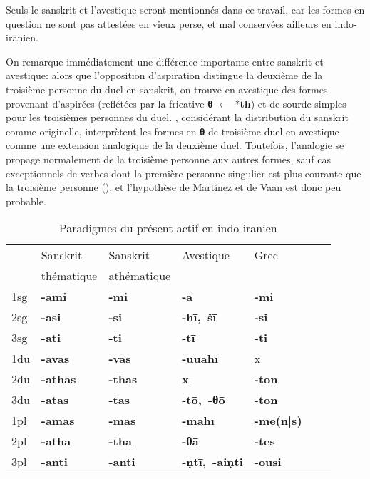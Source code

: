 \documentclass[oneside,a4paper,11pt]{article}
\newcommand{\ipa}[1]{{\phon\mbox{\textbf{#1}}}}
\newcommand{\grise}[1]{\cellcolor{lightgray}\textbf{#1}}
\begin{document}
Seuls le sanskrit et l'avestique seront mentionnés dans ce travail, car les formes en question ne sont pas attestées en vieux perse, et mal conservées ailleurs en indo-iranien.

On remarque immédiatement une différence importante entre sanskrit et avestique: alors que l'opposition d'aspiration distingue la deuxième de la troisième personne du duel en sanskrit,  on trouve en avestique des formes provenant d'aspirées (reflétées par la fricative \ipa{θ} $\leftarrow$ *\ipa{th}) et de sourde simples pour les troisièmes personnes du duel. \citet{martinez14avestan}, considérant la distribution du sanskrit comme originelle, interprètent les formes en \ipa{θ} de troisième duel en avestique comme une extension analogique de la deuxième duel. Toutefois, l'analogie se propage normalement de la troisième personne aux autres formes, sauf cas exceptionnels de verbes dont la première personne singulier est plus courante que la troisième personne (\citealt{jacques16ebde}), et l'hypothèse de Martínez et de Vaan est donc peu probable.

\begin{table}[H]
\caption{Paradigmes du présent actif en indo-iranien} \label{tab:actif}
\begin{tabular}{lllllll}
\toprule
 & 	Sanskrit  & 	Sanskrit & 	Avestique & 	Grec & 	\\
 &thématique&athématique&&\\
\midrule
1sg & 	\ipa{-āmi} & 	\ipa{-mi} & 	\ipa{-ā} & 	\ipa{-mi} & 	\\
2sg & 	\ipa{-asi} & 	\ipa{-si} & 	\ipa{-hī, šī} & 	\ipa{-si} & 	\\
3sg & 	\ipa{-ati} & 	\ipa{-ti} & 	\ipa{-tī} & 	\ipa{-ti} & 	\\
1du & 	\ipa{-āvas} & 	\ipa{-vas} & 	\ipa{-uuahī} & 	x & 	\\
2du & 	\ipa{-athas} \grise{}& 	\ipa{-thas} \grise{}& 	\ipa{x} \grise{}& 	\ipa{-ton} & 	\\
3du & 	\ipa{-atas} \grise{}& 	\ipa{-tas} \grise{}& 	\ipa{-tō, -θō} \grise{}& 	\ipa{-ton} & 	\\
1pl & 	\ipa{-āmas} & 	\ipa{-mas} & 	\ipa{-mahī} & 	\ipa{-me(n|s)} & 	\\
2pl & 	\ipa{-atha}\grise{} & 	\ipa{-tha} \grise{}& 	\ipa{-θā} \grise{}& 	\ipa{-tes} & 	\\
3pl & 	\ipa{-anti} & 	\ipa{-anti} & 	\ipa{-ṇtī, -aiṇti} & 	\ipa{-ousi} & 	\\
\bottomrule
\end{tabular}
\end{table}
\end{document}
